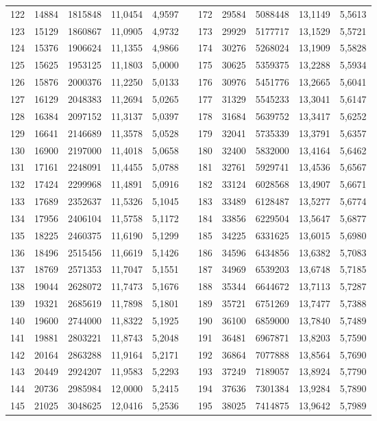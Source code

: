\begin{longtable}{rrrrrrrrrrr}
122&14884&1815848&11,0454&4,9597&&172&29584&5088448&13,1149&5,5613\\
123&15129&1860867&11,0905&4,9732&&173&29929&5177717&13,1529&5,5721\\
124&15376&1906624&11,1355&4,9866&&174&30276&5268024&13,1909&5,5828\\
125&15625&1953125&11,1803&5,0000&&175&30625&5359375&13,2288&5,5934\\
126&15876&2000376&11,2250&5,0133&&176&30976&5451776&13,2665&5,6041\\
127&16129&2048383&11,2694&5,0265&&177&31329&5545233&13,3041&5,6147\\
128&16384&2097152&11,3137&5,0397&&178&31684&5639752&13,3417&5,6252\\
129&16641&2146689&11,3578&5,0528&&179&32041&5735339&13,3791&5,6357\\
130&16900&2197000&11,4018&5,0658&&180&32400&5832000&13,4164&5,6462\\
131&17161&2248091&11,4455&5,0788&&181&32761&5929741&13,4536&5,6567\\
132&17424&2299968&11,4891&5,0916&&182&33124&6028568&13,4907&5,6671\\
133&17689&2352637&11,5326&5,1045&&183&33489&6128487&13,5277&5,6774\\
134&17956&2406104&11,5758&5,1172&&184&33856&6229504&13,5647&5,6877\\
135&18225&2460375&11,6190&5,1299&&185&34225&6331625&13,6015&5,6980\\
136&18496&2515456&11,6619&5,1426&&186&34596&6434856&13,6382&5,7083\\
137&18769&2571353&11,7047&5,1551&&187&34969&6539203&13,6748&5,7185\\
138&19044&2628072&11,7473&5,1676&&188&35344&6644672&13,7113&5,7287\\
139&19321&2685619&11,7898&5,1801&&189&35721&6751269&13,7477&5,7388\\
140&19600&2744000&11,8322&5,1925&&190&36100&6859000&13,7840&5,7489\\
141&19881&2803221&11,8743&5,2048&&191&36481&6967871&13,8203&5,7590\\
142&20164&2863288&11,9164&5,2171&&192&36864&7077888&13,8564&5,7690\\
143&20449&2924207&11,9583&5,2293&&193&37249&7189057&13,8924&5,7790\\
144&20736&2985984&12,0000&5,2415&&194&37636&7301384&13,9284&5,7890\\
145&21025&3048625&12,0416&5,2536&&195&38025&7414875&13,9642&5,7989\\

\end{longtable}
